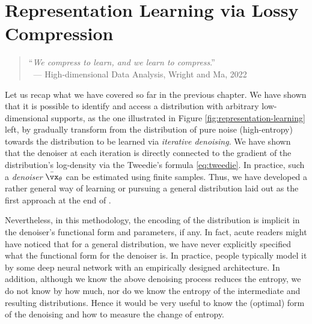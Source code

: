 \documentclass[../../book-main.tex]{subfiles}
\begin{document}
\chapter{Representation Learning via Lossy Compression}
\label{ch:lossy-compression}\label{ch:compression}\label{ch:representation-learning}

\begin{quote}
	\hfill    ``{\em We compress to learn, and we learn to compress}.''\\
	$~$ \hfill --- High-dimensional Data Analysis, Wright and Ma, 2022
\end{quote}
\vspace{5mm}



Let us recap what we have covered so far in the previous chapter. We have shown that it is possible to identify and access a distribution with arbitrary low-dimensional supports, as the one illustrated in  Figure \ref{fig:representation-learning} left, by gradually transform from the distribution of pure noise (high-entropy) towards the distribution to be learned via \textit{iterative denoising}. We have shown that the denoiser at each iteration is directly connected to the gradient of the distribution's log-density via the Tweedie's formula \eqref{eq:tweedie}. In practice, such a \textit{denoiser} \(\bar{\vx}_{\theta}\) can be estimated using finite samples. Thus, we have developed a rather general  way of learning or pursuing a general distribution laid out as the first approach at the end of .

Nevertheless, in this methodology, the encoding of the distribution is implicit in the denoiser's functional form and parameters, if any. In fact, acute readers might have noticed that for a general distribution, we have never explicitly specified what the functional form for the denoiser is. In practice, people typically model it by some deep neural network with an empirically designed architecture. In addition, although we know the above denoising process reduces the entropy, we do not know by how much, nor do we know the entropy of the intermediate and resulting distributions. Hence it would be very useful to know  the (optimal) form of the denoising and how to measure the change of entropy.
\end{document}
